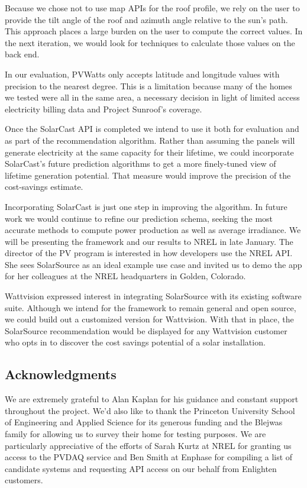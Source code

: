 \documentclass[pageno]{jpaper}
\begin{document}
Because we chose not to use map APIs for the roof profile, we rely on the user to provide the tilt angle of the roof and azimuth angle relative to the sun's path. This approach places a large burden on the user to compute the correct values. In the next iteration, we would look for techniques to calculate those values on the back end.

In our evaluation, PVWatts only accepts latitude and longitude values with precision to the nearest degree. This is a limitation because many of the homes we tested were all in the same area, a necessary decision in light of limited access electricity billing data and Project Sunroof's coverage.

Once the SolarCast API is completed we intend to use it both for evaluation and as part of the recommendation algorithm. Rather than assuming the panels will generate electricity at the same capacity for their lifetime, we could incorporate SolarCast's future prediction algorithms to get a more finely-tuned view of lifetime generation potential. That measure would improve the precision of the cost-savings estimate.

Incorporating SolarCast is just one step in improving the algorithm. In future work we would continue to refine our prediction schema, seeking the most accurate methods to compute power production as well as average irradiance. We will be presenting the framework and our results to NREL in late January. The director of the PV program is interested in how developers use the NREL API. She sees SolarSource as an ideal example use case and invited us to demo the app for her colleagues at the NREL headquarters in Golden, Colorado.

Wattvision expressed interest in integrating SolarSource with its existing software suite. Although we intend for the framework to remain general and open source, we could build out a customized version for Wattvision. With that in place, the SolarSource recommendation would be displayed for any Wattvision customer who opts in to discover the cost savings potential of a solar installation.

\subsection{Acknowledgments}
We are extremely grateful to Alan Kaplan for his guidance and constant support throughout the project. We'd also like to thank the Princeton University School of Engineering and Applied Science for its generous funding and the Blejwas family for allowing us to survey their home for testing purposes. We are particularly appreciative of the efforts of Sarah Kurtz at NREL for granting us access to the PVDAQ service and Ben Smith at Enphase for compiling a list of candidate systems and requesting API access on our behalf from Enlighten customers.



\end{document}
